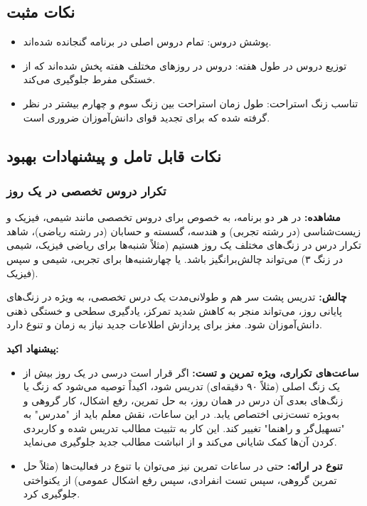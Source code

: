 \documentclass[a4paper,14pt]{article}
\begin{document}
\subsection*{نکات مثبت}
\begin{itemize}
    \item پوشش دروس: تمام دروس اصلی در برنامه گنجانده شده‌اند.
    \item توزیع دروس در طول هفته: دروس در روزهای مختلف هفته پخش شده‌اند که از خستگی مفرط جلوگیری می‌کند.
    \item تناسب زنگ استراحت: طول زمان استراحت بین زنگ سوم و چهارم بیشتر در نظر گرفته شده که برای تجدید قوای دانش‌آموزان ضروری است.
\end{itemize}
\bigskip

\subsection*{نکات قابل تامل و پیشنهادات بهبود}
\medskip

\subsubsection*{تکرار دروس تخصصی در یک روز}
\textbf{مشاهده:} در هر دو برنامه، به خصوص برای دروس تخصصی مانند شیمی، فیزیک و زیست‌شناسی (در رشته تجربی) و هندسه، گسسته و حسابان (در رشته ریاضی)، شاهد تکرار درس در زنگ‌های مختلف یک روز هستیم (مثلاً شنبه‌ها برای ریاضی فیزیک، شیمی در زنگ ۳) می‌تواند چالش‌برانگیز باشد. یا چهارشنبه‌ها برای تجربی، شیمی و سپس فیزیک).

\textbf{چالش:} تدریس پشت سر هم و طولانی‌مدت یک درس تخصصی، به ویژه در زنگ‌های پایانی روز، می‌تواند منجر به کاهش شدید تمرکز، یادگیری سطحی و خستگی ذهنی دانش‌آموزان شود. مغز برای پردازش اطلاعات جدید نیاز به زمان و تنوع دارد.

\textbf{پیشنهاد اکید:}
\begin{itemize}
    \item \textbf{ساعت‌های تکراری، ویژه تمرین و تست:}  اگر قرار است درسی در یک روز بیش از یک زنگ اصلی (مثلاً ۹۰ دقیقه‌ای) تدریس شود، اکیداً توصیه می‌شود که زنگ یا زنگ‌های بعدی آن درس در همان روز، به حل تمرین، رفع اشکال، کار گروهی و به‌ویژه تست‌زنی اختصاص یابد. در این ساعات، نقش معلم باید از "مدرس" به "تسهیل‌گر و راهنما" تغییر کند. این کار به تثبیت مطالب تدریس شده و کاربردی کردن آن‌ها کمک شایانی می‌کند و از انباشت مطالب جدید جلوگیری می‌نماید.
    \item \textbf{تنوع در ارائه:} حتی در ساعات تمرین نیز می‌توان با تنوع در فعالیت‌ها (مثلاً حل تمرین گروهی، سپس تست انفرادی، سپس رفع اشکال عمومی) از یکنواختی جلوگیری کرد.
\end{itemize}
\medskip
\end{document}
